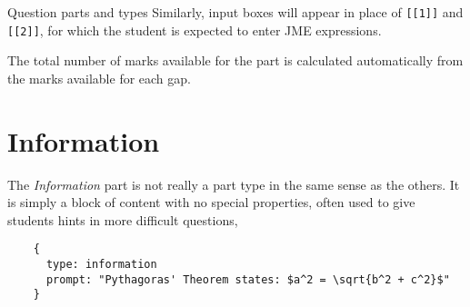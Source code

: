 \begin{chapter}{\label{cha:question_parts}Question parts and types}
  Similarly, input boxes will appear in place of \verb"[[1]]" and \verb"[[2]]",
  for which the student is expected to enter JME expressions.

  The total number of marks available for the part is calculated automatically
  from the marks available for each gap.

  \section{\label{sec:information_part}Information}
  The \emph{Information} part is not really a part type in the same sense as
  the others.  It is simply a block of content with no special properties,
  often used to give students hints in more difficult questions, \eg
  \begin{Verbatim}
    {
      type: information
      prompt: "Pythagoras' Theorem states: $a^2 = \sqrt{b^2 + c^2}$"
    }
  \end{Verbatim}

\end{chapter}
